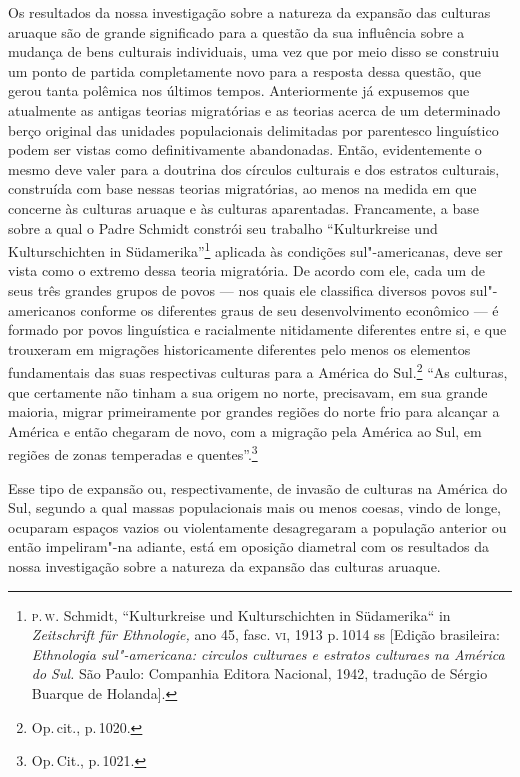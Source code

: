Os resultados da nossa investigação sobre a natureza da expansão das
culturas aruaque são de grande significado para a questão da sua
influência sobre a mudança de bens culturais individuais, uma vez que
por meio disso se construiu um ponto de partida completamente novo para
a resposta dessa questão, que gerou tanta polêmica nos últimos tempos.
Anteriormente já expusemos que atualmente as antigas teorias migratórias
e as teorias acerca de um determinado berço original das unidades
populacionais delimitadas por parentesco linguístico podem ser vistas
como definitivamente abandonadas. Então, evidentemente o mesmo deve
valer para a doutrina dos círculos culturais e dos estratos culturais,
construída com base nessas teorias migratórias, ao menos na medida em
que concerne às culturas aruaque e às culturas aparentadas. Francamente,
a base sobre a qual o Padre Schmidt constrói seu trabalho ``Kulturkreise
und Kulturschichten in Südamerika''\footnote{\textsc{p}.\,\textsc{w}. Schmidt,
  ``Kulturkreise und Kulturschichten in Südamerika`` in
  \textit{Zeitschrift für Ethnologie,} ano 45, fasc. \textsc{vi}, 1913 p.\,1014 ss
  {[}Edição brasileira: \textit{Ethnologia sul"-americana: circulos
  culturaes e estratos culturaes na América do Sul.} São Paulo:
  Companhia Editora Nacional, 1942, tradução de Sérgio Buarque de
  Holanda{]}.} aplicada às condições sul"-americanas, deve ser vista como
o extremo dessa teoria migratória. De acordo com ele, cada um de seus
três grandes grupos de povos --- nos quais ele classifica diversos povos
sul"-americanos conforme os diferentes graus de seu desenvolvimento
econômico --- é formado por povos linguística e racialmente nitidamente
diferentes entre si, e que trouxeram em migrações historicamente
diferentes pelo menos os elementos fundamentais das suas respectivas
culturas para a América do Sul.\footnote{Op.\,cit., p.\,1020.} ``As
culturas, que certamente não tinham a sua origem no norte, precisavam,
em sua grande maioria, migrar primeiramente por grandes regiões do
norte frio para alcançar a América e então chegaram de novo, com a
migração pela América ao Sul, em regiões de zonas temperadas e
quentes''.\footnote{Op.\,Cit., p.\,1021.}

Esse tipo de expansão ou, respectivamente, de invasão de culturas na
América do Sul, segundo a qual massas populacionais mais ou menos
coesas, vindo de longe, ocuparam espaços vazios ou violentamente
desagregaram a população anterior ou então impeliram"-na adiante, está em
oposição diametral com os resultados da nossa investigação sobre a
natureza da expansão das culturas aruaque.

